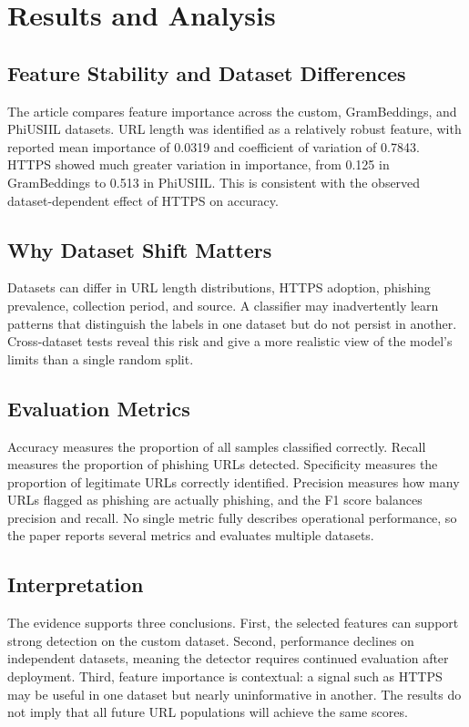 \chapter{Results and Analysis}
\setcounter{equation}{0}
\section{Feature Stability and Dataset Differences}
The article compares feature importance across the custom, GramBeddings, and PhiUSIIL datasets. URL length was identified as a relatively robust feature, with reported mean importance of 0.0319 and coefficient of variation of 0.7843. HTTPS showed much greater variation in importance, from 0.125 in GramBeddings to 0.513 in PhiUSIIL. This is consistent with the observed dataset-dependent effect of HTTPS on accuracy.\cite{bib1}

\section{Why Dataset Shift Matters}
Datasets can differ in URL length distributions, HTTPS adoption, phishing prevalence, collection period, and source. A classifier may inadvertently learn patterns that distinguish the labels in one dataset but do not persist in another. Cross-dataset tests reveal this risk and give a more realistic view of the model's limits than a single random split.

\section{Evaluation Metrics}
Accuracy measures the proportion of all samples classified correctly. Recall measures the proportion of phishing URLs detected. Specificity measures the proportion of legitimate URLs correctly identified. Precision measures how many URLs flagged as phishing are actually phishing, and the F1 score balances precision and recall. No single metric fully describes operational performance, so the paper reports several metrics and evaluates multiple datasets.\cite{bib1}

\section{Interpretation}
The evidence supports three conclusions. First, the selected features can support strong detection on the custom dataset. Second, performance declines on independent datasets, meaning the detector requires continued evaluation after deployment. Third, feature importance is contextual: a signal such as HTTPS may be useful in one dataset but nearly uninformative in another. The results do not imply that all future URL populations will achieve the same scores.
